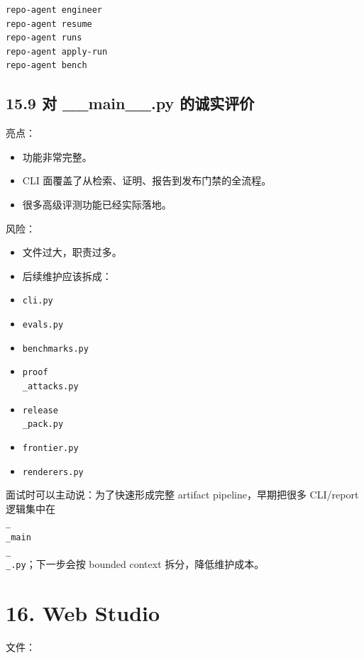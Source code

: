 \documentclass[UTF8,12pt,openany]{ctexbook}
\begin{document}
\begin{lstlisting}
repo-agent engineer
repo-agent resume
repo-agent runs
repo-agent apply-run
repo-agent bench
\end{lstlisting}

\subsection{15.9 对 \_\_main\_\_.py 的诚实评价}

亮点：\par

\begin{itemize}
\item 功能非常完整。
\item CLI 面覆盖了从检索、证明、报告到发布门禁的全流程。
\item 很多高级评测功能已经实际落地。
\end{itemize}

风险：\par

\begin{itemize}
\item 文件过大，职责过多。
\item 后续维护应该拆成：
\item \texttt{cli.py}
\item \texttt{evals.py}
\item \texttt{benchmarks.py}
\item \texttt{proof\\_attacks.py}
\item \texttt{release\\_pack.py}
\item \texttt{frontier.py}
\item \texttt{renderers.py}
\end{itemize}

面试时可以主动说：为了快速形成完整 artifact pipeline，早期把很多 CLI/report 逻辑集中在 \texttt{\\_\\_main\\_\\_.py}；下一步会按 bounded context 拆分，降低维护成本。\par

\section{16. Web Studio}

文件：\par
\end{document}
